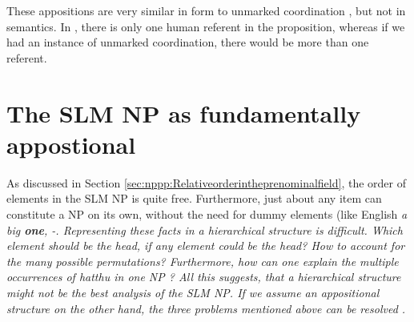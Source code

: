  \\
 \\


These appositions are very similar in form to unmarked coordination , but not in semantics. In , there is only one human referent in the proposition, whereas if we had an instance of unmarked coordination, there would be more than one referent.

\section{The SLM NP as fundamentally appostional}\label{sec:nppp:TheSLMNPasappositional}
As discussed in Section \ref{sec:nppp:Relativeorderintheprenominalfield}, the order of elements in the SLM NP is quite free. Furthermore, just about any item can constitute a NP on its own, without the need for dummy elements (like English \em a big \textbf{one}\em, -. Representing these facts in a hierarchical structure is difficult. Which element should be the head, if any element could be the head? How to account for the many possible permutations? Furthermore, how can one explain the multiple occurrences of \em hatthu \em in one NP ? All this suggests, that a hierarchical structure might not be the best analysis of the SLM NP. If we assume an appositional structure on the other hand, the three problems mentioned above can be resolved \citep[cf.][]{Rijkhoff2002}.\kuckn

